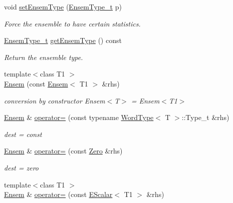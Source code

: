 \begin{DoxyCompactItemize}
\item 
void \mbox{\hyperlink{classENSEM_1_1Ensem_a5fdfac362fd4347e4383b4e0a8537aec}{set\+Ensem\+Type}} (\mbox{\hyperlink{namespaceENSEM_a2dc2c4a26884f343471e52f23479ddbe}{Ensem\+Type\+\_\+t}} p)
\begin{DoxyCompactList}\small\item\em Force the ensemble to have certain statistics. \end{DoxyCompactList}\item 
\mbox{\hyperlink{namespaceENSEM_a2dc2c4a26884f343471e52f23479ddbe}{Ensem\+Type\+\_\+t}} \mbox{\hyperlink{classENSEM_1_1Ensem_aa2cfc665852c06f9b058a1a2233d249e}{get\+Ensem\+Type}} () const
\begin{DoxyCompactList}\small\item\em Return the ensemble type. \end{DoxyCompactList}\item 
{\footnotesize template$<$class T1 $>$ }\\\mbox{\hyperlink{classENSEM_1_1Ensem_ab0e04ebf09af997fb7f1477cdc48145b}{Ensem}} (const \mbox{\hyperlink{classENSEM_1_1Ensem}{Ensem}}$<$ T1 $>$ \&rhs)
\begin{DoxyCompactList}\small\item\em conversion by constructor Ensem$<$\+T$>$ = Ensem$<$\+T1$>$ \end{DoxyCompactList}\item 
\mbox{\hyperlink{classENSEM_1_1Ensem}{Ensem}} \& \mbox{\hyperlink{classENSEM_1_1Ensem_a1331b77ba6b10ddefa983e39976b4db6}{operator=}} (const typename \mbox{\hyperlink{structENSEM_1_1WordType}{Word\+Type}}$<$ T $>$\+::Type\+\_\+t \&rhs)
\begin{DoxyCompactList}\small\item\em dest = const \end{DoxyCompactList}\item 
\mbox{\hyperlink{classENSEM_1_1Ensem}{Ensem}} \& \mbox{\hyperlink{classENSEM_1_1Ensem_a55913bc59bca1022f5189cbc86632c11}{operator=}} (const \mbox{\hyperlink{structENSEM_1_1Zero}{Zero}} \&rhs)
\begin{DoxyCompactList}\small\item\em dest = zero \end{DoxyCompactList}\item 
{\footnotesize template$<$class T1 $>$ }\\\mbox{\hyperlink{classENSEM_1_1Ensem}{Ensem}} \& \mbox{\hyperlink{classENSEM_1_1Ensem_a376ab0239198595a09384c13d7a1ad1c}{operator=}} (const \mbox{\hyperlink{classENSEM_1_1EScalar}{E\+Scalar}}$<$ T1 $>$ \&rhs)

\end{DoxyCompactItemize}
